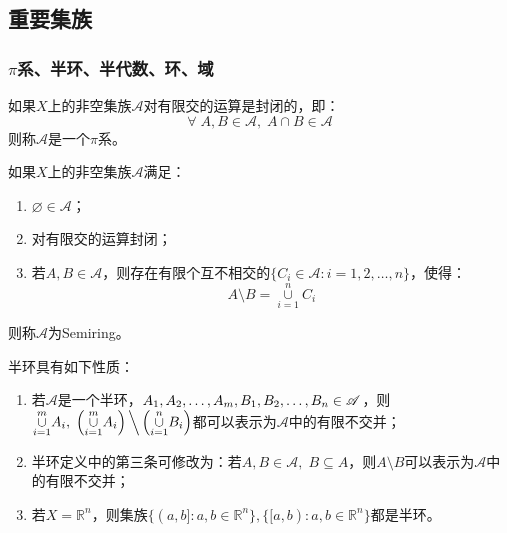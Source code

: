 \subsection{重要集族}
\subsubsection{$\pi$系、半环、半代数、环、域}
\begin{definition}
	如果$X$上的非空集族$\mathscr{A}$对有限交的运算是封闭的，即：
	\begin{equation*}
		\forall\;A,B\in\mathscr{A},\;A\cap B\in\mathscr{A}
	\end{equation*}
	则称$\mathscr{A}$是一个$\pi$系。
\end{definition}
\begin{definition}
	如果$X$上的非空集族$\mathscr{A}$满足：
	\begin{enumerate}
		\item $\varnothing\in\mathscr{A}$；
		\item 对有限交的运算封闭；
		\item 若$A,B\in\mathscr{A}$，则存在有限个互不相交的$\{C_i\in\mathscr{A}:i=1,2,\dots,n\}$，使得：
		\begin{equation*}
			A\setminus B=\underset{i=1}{\overset{n}{\cup}}C_i
		\end{equation*}
	\end{enumerate}
	则称$\mathscr{A}$为\gls{Semiring}。
\end{definition}
\begin{property}\label{prop:Semiring}
	半环具有如下性质：
	\begin{enumerate}
		\item 若$\mathscr{A}$是一个半环，$A_1, A_2, \dots, A_{m},B_1, B_2, \dots, B_{n}\in\mathscr{A}$，则$\underset{i=1}{\overset{m}{\cup}}A_i,\;\left(\underset{i=1}{\overset{m}{\cup}}A_i\right)\Big\backslash\left(\underset{i=1}{\overset{n}{\cup}}B_i\right)$都可以表示为$\mathscr{A}$中的有限不交并；
		\item 半环定义中的第三条可修改为：若$A,B\in\mathscr{A},\;B\subseteq A$，则$A\setminus B$可以表示为$\mathscr{A}$中的有限不交并；
		\item 若$X=\mathbb{R}^{n}$，则集族$\{(a,b]:a,b\in\mathbb{R}^{n}\},\{[a,b):a,b\in\mathbb{R}^{n}\}$都是半环。
	\end{enumerate}
\end{property}
